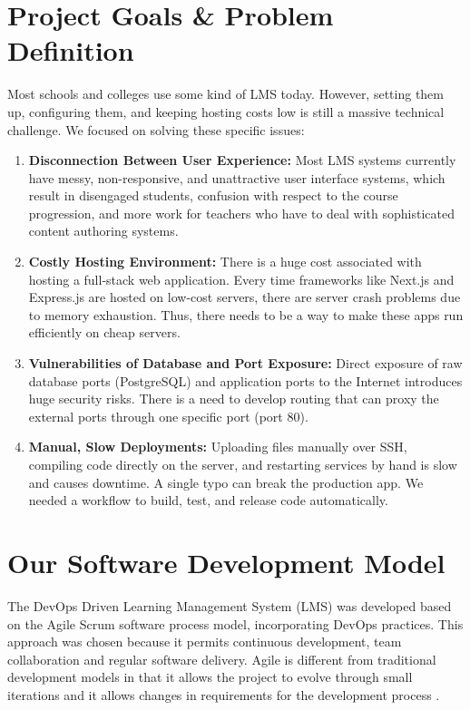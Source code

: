 \documentclass[12pt,a4paper]{article}
\begin{document}
\section{Project Goals \& Problem Definition}
Most schools and colleges use some kind of LMS today. However, setting them up, configuring them, and keeping hosting costs low is still a massive technical challenge. We focused on solving these specific issues:

\begin{enumerate}
    \item \textbf{Disconnection Between User Experience:} Most LMS systems currently have messy, non-responsive, and unattractive user interface systems, which result in disengaged students, confusion with respect to the course progression, and more work for teachers who have to deal with sophisticated content authoring systems.
    \item \textbf{Costly Hosting Environment:} There is a huge cost associated with hosting a full-stack web application. Every time frameworks like Next.js and Express.js are hosted on low-cost servers, there are server crash problems due to memory exhaustion. Thus, there needs to be a way to make these apps run efficiently on cheap servers.
    \item \textbf{Vulnerabilities of Database and Port Exposure:} Direct exposure of raw database ports (PostgreSQL) and application ports to the Internet introduces huge security risks. There is a need to develop routing that can proxy the external ports through one specific port (port 80).
    \item \textbf{Manual, Slow Deployments:} Uploading files manually over SSH, compiling code directly on the server, and restarting services by hand is slow and causes downtime. A single typo can break the production app. We needed a workflow to build, test, and release code automatically.
\end{enumerate}

\section{Our Software Development Model}
The DevOps Driven Learning Management System (LMS) was developed based on the Agile Scrum software process model, incorporating DevOps practices. This approach was chosen because it permits continuous development, team collaboration and regular software delivery. Agile is different from traditional development models in that it allows the project to evolve through small iterations and it allows changes in requirements for the development process .
\end{document}
